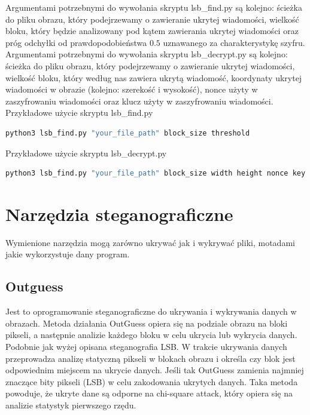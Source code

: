 \documentclass{article}
\begin{document}
Argumentami potrzebnymi do wywołania skryptu lsb\_find.py są kolejno: ścieżka do pliku obrazu, który podejrzewamy o zawieranie ukrytej wiadomości, wielkość bloku, który będzie
 analizowany pod kątem zawierania ukrytej wiadomości oraz próg odchyłki od prawdopodobieństwa $0.5$ uznawanego za charakterystykę szyfru.\\
Argumentami potrzebnymi do wywołania skryptu lsb\_decrypt.py są kolejno: ścieżka do pliku obrazu, który podejrzewamy o zawieranie ukrytej wiadomości, wielkość bloku, który według nas zawiera ukrytą wiadomość, koordynaty ukrytej wiadomości w obrazie (kolejno: szerekość i wysokość), nonce użyty w zaszyfrowaniu wiadomości oraz klucz użyty w zaszyfrowaniu 
wiadomości.\\

Przykładowe użycie skryptu lsb\_find.py
\begin{lstlisting}[language=bash]
python3 lsb_find.py "your_file_path" block_size threshold
\end{lstlisting}

Przykładowe użycie skryptu lsb\_decrypt.py
\begin{lstlisting}[language=bash]
python3 lsb_find.py "your_file_path" block_size width height nonce key
\end{lstlisting}

\section{Narzędzia steganograficzne}
Wymienione narzędzia mogą zarówno ukrywać jak i wykrywać pliki, motadami jakie wykorzystuje dany program.
\subsection{Outguess}
Jest to oprogramowanie steganograficzne do ukrywania i wykrywania danych w obrazach. 
Metoda działania OutGuess opiera się na podziale obrazu na bloki pikseli, a następnie analizie każdego bloku w celu ukrycia lub wykrycia danych. Podobnie jak wyżej opisana steganografia LSB. W trakcie ukrywania danych przeprowadza analizę statyczną pikseli w blokach obrazu i określa czy blok jest odpowiednim miejscem na ukrycie danych. Jeśli tak OutGuess zamienia najmniej znaczące bity pikseli (LSB) w celu zakodowania ukrytych danych. Taka metoda powoduje, że ukryte dane są odporne na chi-square attack, który opiera się na analizie statystyk pierwszego rzędu.
\end{document}

